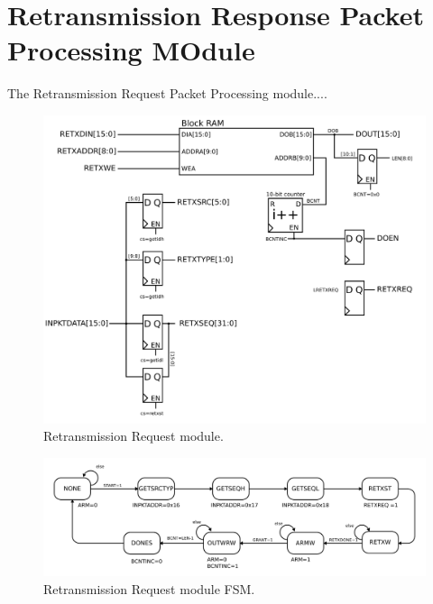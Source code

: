 \section{Retransmission Response Packet Processing MOdule} 

The Retransmission Request Packet Processing module....

\begin{figure}
\begin{centering}
\includegraphics[scale=0.8]{retxresponse.svg}
\end{centering}
\caption{Retransmission Request module.}
\label{retxresponse}
\end{figure}

\begin{figure}
\begin{centering}
\includegraphics[scale=0.8]{retxresponse.fsm.svg}
\end{centering}
\caption{Retransmission Request module FSM.}
\label{retxresponse.fsm}
\end{figure}
